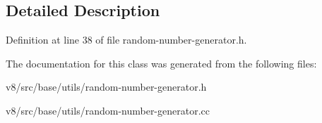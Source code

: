 \subsection{Detailed Description}


Definition at line 38 of file random-\/number-\/generator.\+h.



The documentation for this class was generated from the following files\+:\begin{DoxyCompactItemize}
\item 
v8/src/base/utils/random-\/number-\/generator.\+h\item 
v8/src/base/utils/random-\/number-\/generator.\+cc\end{DoxyCompactItemize}
